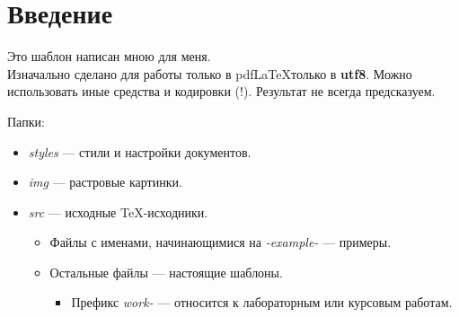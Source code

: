 \section{Введение}

Это шаблон написан мною для меня.\\
Изначально сделано для работы только в pdf\LaTeX только в \textbf{utf8}.
Можно использовать иные средства и кодировки (!). Результат не всегда предсказуем.

Папки:
\begin{itemize}
	\item \textit{styles} --- стили и настройки документов.
	\item \textit{img} --- растровые картинки.
	\item \textit{src} --- исходные \TeX-исходники.
	\begin{itemize}
		\item Файлы с именами, начинающимися на \textit{-example-} --- примеры.
		\item Остальные файлы --- настоящие шаблоны.
		\begin{itemize}
			\item Префикс \textit{work-} --- относится к лабораторным или курсовым работам.
		\end{itemize}	
	\end{itemize}
	
\end{itemize}

\pagebreak

